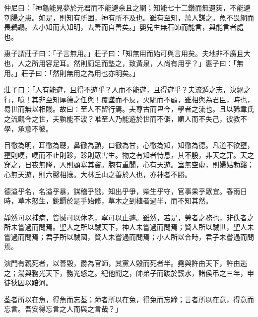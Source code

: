 \begin{pinyinscope}
仲尼曰：「神龜能見夢於元君而不能避余且之網；知能七十二鑽而無遺筴，不能避刳腸之患。如是，則知有所困，神有所不及也。雖有至知，萬人謀之。魚不畏網而畏鵜鶘。去小知而大知明，去善而自善矣。」嬰兒生無石師而能言，與能言者處也。

惠子謂莊子曰：「子言無用。」莊子曰：「知無用而始可與言用矣。夫地非不廣且大也，人之所用容足耳。然則廁足而墊之，致黃泉，人尚有用乎？」惠子曰：「無用。」莊子曰：「然則無用之為用也亦明矣。」

莊子曰：「人有能遊，且得不遊乎？人而不能遊，且得遊乎？夫流遁之志，決絕之行，噫！其非至知厚德之任與！覆墜而不反，火馳而不顧，雖相與為君臣，時也，易世而無以相賤。故曰：至人不留行焉。夫尊古而卑今，學者之流也。且以豨韋氏之流觀今之世，夫孰能不波？唯至人乃能遊於世而不僻，順人而不失己，彼教不學，承意不彼。

目徹為明，耳徹為聰，鼻徹為顫，口徹為甘，心徹為知，知徹為德。凡道不欲壅，壅則哽，哽而不止則跈，跈則眾害生。物之有知者恃息，其不殷，非天之罪。天之穿之，日夜無降，人則顧塞其竇。胞有重閬，心有天遊。室無空虛，則婦姑勃谿；心無天遊，則六鑿相攘。大林丘山之善於人也，亦神者不勝。

德溢乎名，名溢乎暴，謀稽乎誸，知出乎爭，柴生乎守，官事果乎眾宜。春雨日時，草木怒生，銚鎒於是乎始修，草木之到植者過半，而不知其然。

靜然可以補病，眥搣可以休老，寧可以止遽。雖然，若是，勞者之務也，非佚者之所未嘗過而問焉。聖人之所以駴天下，神人未嘗過而問焉；賢人所以駴世，聖人未嘗過而問焉；君子所以駴國，賢人未嘗過而問焉；小人所以合時，君子未嘗過而問焉。

演門有親死者，以善毀，爵為官師，其黨人毀而死者半。堯與許由天下，許由逃之；湯與務光天下，務光怒之。紀他聞之，帥弟子而踆於窾水，諸侯弔之三年，申徒狄因以踣河。

荃者所以在魚，得魚而忘荃；蹄者所以在兔，得兔而忘蹄；言者所以在意，得意而忘言。吾安得忘言之人而與之言哉？」


\end{pinyinscope}